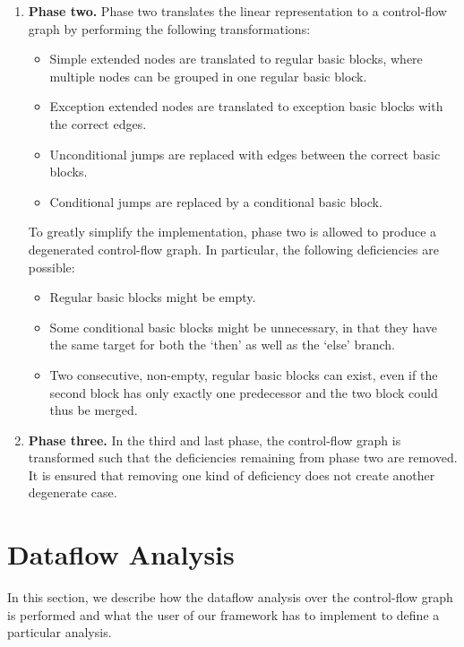 \begin{enumerate}
    \item \textbf{Phase two.} Phase two translates the linear representation to a control-flow graph
    by performing the following transformations:
    \begin{itemize}
        \item Simple extended nodes are translated to regular basic blocks, where multiple nodes
        can be grouped in one regular basic block.
        \item Exception extended nodes are translated to exception basic blocks with the correct edges.
        \item Unconditional jumps are replaced with edges between the correct basic blocks.
        \item Conditional jumps are replaced by a conditional basic block.
    \end{itemize}
    To greatly simplify the implementation, phase two is allowed to produce a degenerated control-flow
    graph. In particular, the following deficiencies are possible:
    \begin{itemize}
    \item Regular basic blocks might be empty.
    \item Some conditional basic blocks might be unnecessary, in that they have the same target for both
    the `then' as well as the `else' branch.
    \item Two consecutive, non-empty, regular basic blocks can exist, even if the second block has only
    exactly one predecessor and the two block could thus be merged.
    \end{itemize}
    \item \textbf{Phase three.} In the third and last phase, the control-flow graph is transformed such that
    the deficiencies remaining from phase two are removed. It is ensured that removing one kind of deficiency
    does not create another degenerate case.
\end{enumerate}






\section{Dataflow Analysis}

In this section, we describe how the dataflow analysis over the control-flow
graph is performed and what the user of our framework has to implement to
define a particular analysis.


